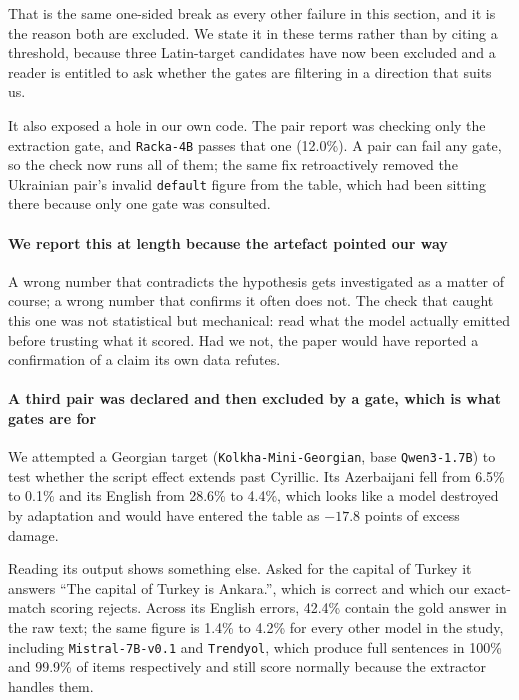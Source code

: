 \documentclass[final]{clv2025}
\begin{document}
That is the same one-sided break as every other failure in this section, and it
is the reason both are excluded. We state it in these terms rather than by
citing a threshold, because three Latin-target candidates have now been
excluded and a reader is entitled to ask whether the gates are filtering in a
direction that suits us.

It also exposed a hole in our own code. The pair report was checking only the
extraction gate, and \texttt{Racka-4B} passes that one (12.0\%). A pair can
fail any gate, so the check now runs all of them; the same fix retroactively
removed the Ukrainian pair's invalid \texttt{default} figure from the table,
which had been sitting there because only one gate was consulted.

\paragraph{We report this at length because the artefact pointed our way} A
wrong number that contradicts the hypothesis gets investigated as a matter of
course; a wrong number that confirms it often does not. The check that caught
this one was not statistical but mechanical: read what the model actually
emitted before trusting what it scored. Had we not, the paper would have
reported a confirmation of a claim its own data refutes.

\paragraph{A third pair was declared and then excluded by a gate, which is what
gates are for} We attempted a Georgian target
(\texttt{Kolkha-Mini-Georgian}, base \texttt{Qwen3-1.7B}) to test whether the
script effect extends past Cyrillic. Its Azerbaijani fell from 6.5\% to 0.1\%
and its English from 28.6\% to 4.4\%, which looks like a model destroyed by
adaptation and would have entered the table as $-17.8$ points of excess damage.

Reading its output shows something else. Asked for the capital of Turkey it
answers ``The capital of Turkey is Ankara.'', which is correct and which our
exact-match scoring rejects. Across its English errors, 42.4\% contain the gold
answer in the raw text; the same figure is 1.4\% to 4.2\% for every other model
in the study, including \texttt{Mistral-7B-v0.1} and \texttt{Trendyol}, which
produce full sentences in 100\% and 99.9\% of items respectively and still
score normally because the extractor handles them.
\end{document}
